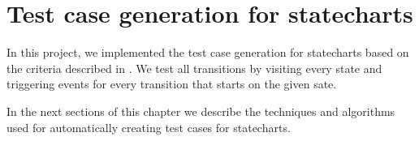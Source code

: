 \chapter{Test case generation for statecharts}
\label{cap:testgen}


%

%

In this project, we implemented the test case generation for statecharts based on the criteria described in \cite{bogdanov}. We test all transitions by visiting every state and triggering events for every transition that starts on the given sate. 

In the next sections of this chapter we describe the techniques and algorithms used for automatically creating test cases for statecharts. 





